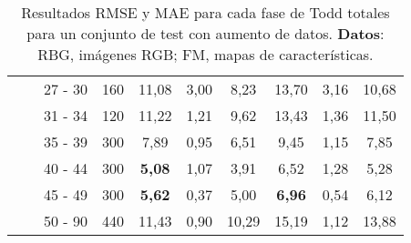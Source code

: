 \begin{table}[ht!]
{\begin{tabular}{|l|c|c|c|c|c|c|c|c|c|}
 &  & 27 - 30 & 160 & 11,08 & 3,00 & 8,23 & 13,70 & 3,16 & 10,68 \\
 &  & 31 - 34 & 120 & 11,22 & 1,21 & 9,62 & 13,43 & 1,36 & 11,50 \\
 &  & 35 - 39 & 300 & 7,89 & 0,95 & 6,51 & 9,45 & 1,15 & 7,85 \\
 &  & 40 - 44 & 300 & \textbf{5,08} & 1,07 & 3,91 & 6,52 & 1,28 & 5,28 \\
 &  & 45 - 49 & 300 & \textbf{5,62} & 0,37 & 5,00 & \textbf{6,96} & 0,54 & 6,12 \\
 &  & 50 - 90 & 440 & 11,43 & 0,90 & 10,29 & 15,19 & 1,12 & 13,88 \\
\hline
\end{tabular}
}
\caption[Resultados RMSE y MAE para cada fase de Todd totales para un conjunto de test con aumento de datos.]{Resultados RMSE y MAE para cada fase de Todd totales para un conjunto de test con aumento de datos. \textbf{Datos}: RBG, imágenes RGB; FM, mapas de características.}
\label{tab:rtodd_c_total}
\end{table}

